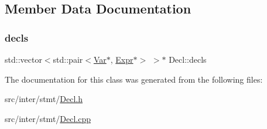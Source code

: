 \subsection{Member Data Documentation}
\mbox{\label{class_decl_a7e84697f4d13126d1234a49b68af7eeb}} 
\subsubsection{\texorpdfstring{decls}{decls}}
{\footnotesize\ttfamily std\+::vector$<$std\+::pair$<$\hyperlink{class_var}{Var}$\ast$, \hyperlink{class_expr}{Expr}$\ast$$>$ $>$$\ast$ Decl\+::decls\hspace{0.3cm}{\ttfamily [protected]}}



The documentation for this class was generated from the following files\+:\begin{DoxyCompactItemize}
\item 
src/inter/stmt/\hyperlink{_decl_8h}{Decl.\+h}\item 
src/inter/stmt/\hyperlink{_decl_8cpp}{Decl.\+cpp}\end{DoxyCompactItemize}

